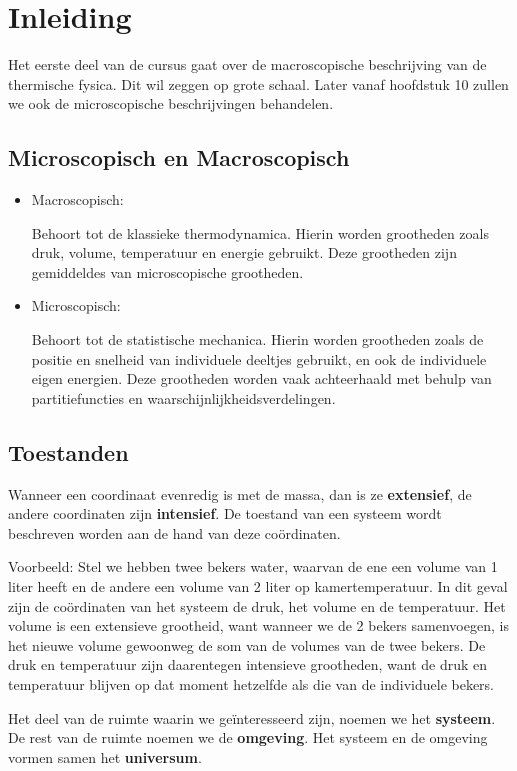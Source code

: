 \section{Inleiding}

Het eerste deel van de cursus gaat over de macroscopische beschrijving van de thermische fysica. Dit wil zeggen op grote schaal. Later vanaf hoofdstuk 10 zullen we ook de microscopische beschrijvingen behandelen.
\subsection{Microscopisch en Macroscopisch}

\begin{itemize}
    \item Macroscopisch:

    Behoort tot de klassieke thermodynamica. Hierin worden grootheden zoals druk, volume, temperatuur en energie gebruikt. Deze grootheden zijn gemiddeldes van microscopische grootheden.
    \item Microscopisch:

    Behoort tot de statistische mechanica. Hierin worden grootheden zoals de positie en snelheid van individuele deeltjes gebruikt, en ook de individuele eigen energien. Deze grootheden worden vaak achteerhaald met behulp van partitiefuncties en waarschijnlijkheidsverdelingen.
\end{itemize}

\subsection{Toestanden}

Wanneer een coordinaat evenredig is met de massa, dan is ze \textbf{extensief}, de andere coordinaten zijn \textbf{intensief}. De toestand van een systeem wordt beschreven worden aan de hand van deze coördinaten.

Voorbeeld: Stel we hebben twee bekers water, waarvan de ene een volume van 1 liter heeft en de andere een volume van 2 liter op kamertemperatuur. In dit geval zijn de coördinaten van het systeem de druk, het volume en de temperatuur.
Het volume is een extensieve grootheid, want wanneer we de 2 bekers samenvoegen, is het nieuwe volume gewoonweg de som van de volumes van de twee bekers. De druk en temperatuur zijn daarentegen intensieve grootheden, want de druk en temperatuur blijven op dat moment hetzelfde als die van de individuele bekers.

Het deel van de ruimte waarin we geïnteresseerd zijn, noemen we het \textbf{systeem}. De rest van de ruimte noemen we de \textbf{omgeving}. Het systeem en de omgeving vormen samen het \textbf{universum}.

